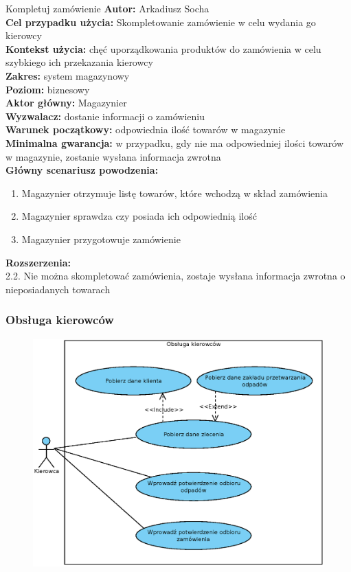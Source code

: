 	\begin{usecase}{Kompletuj zamówienie}
		\textbf{Autor:} Arkadiusz Socha\\
		\textbf{Cel przypadku użycia:} Skompletowanie zamówienie w celu wydania go kierowcy \\
		\textbf{Kontekst użycia:} chęć uporządkowania produktów do zamówienia w celu szybkiego ich przekazania kierowcy \\
		\textbf{Zakres:} system magazynowy \\
		\textbf{Poziom:} biznesowy \\
		\textbf{Aktor główny:} Magazynier \\
		\textbf{Wyzwalacz:} dostanie informacji o zamówieniu \\
		\textbf{Warunek początkowy:} odpowiednia ilość towarów w magazynie \\
		\textbf{Minimalna gwarancja:} w przypadku, gdy nie ma odpowiedniej ilości towarów w magazynie, zostanie wysłana informacja zwrotna  \\
		\textbf{Główny scenariusz powodzenia:} 
			\begin{enumerate}
				\item Magazynier otrzymuje listę towarów, które wchodzą w skład zamówienia
				\item Magazynier sprawdza czy posiada ich odpowiednią ilość
				\item Magazynier przygotowuje zamówienie
			\end{enumerate}
		\textbf{Rozszerzenia:} \\
		2.2. Nie można skompletować zamówienia, zostaje wysłana informacja zwrotna o nieposiadanych towarach\\
	\end{usecase}

\subsubsection{Obsługa kierowców}

	\begin{figure}[H]
		\centering
		\includegraphics[width=.8\textwidth]{img/UC/kierowcy.eps}
	\end{figure}

